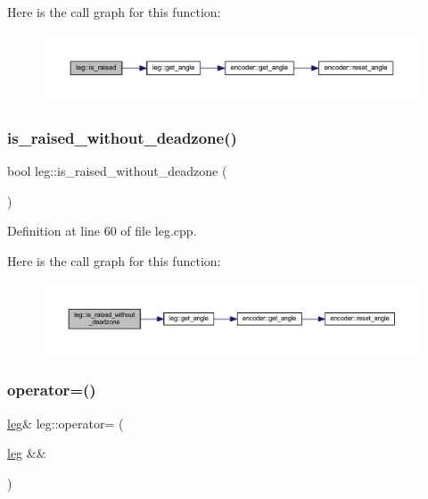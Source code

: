 Here is the call graph for this function\+:
\nopagebreak
\begin{figure}[H]
\begin{center}
\leavevmode
\includegraphics[width=350pt]{classleg_a24893e209229c5a70d748f2471cd4370_cgraph}
\end{center}
\end{figure}
\mbox{\label{classleg_a1dbdd2bb120d877c15b1ea831b720135}} 
\subsubsection{\texorpdfstring{is\_raised\_without\_deadzone()}{is\_raised\_without\_deadzone()}}
{\footnotesize\ttfamily bool leg\+::is\+\_\+raised\+\_\+without\+\_\+deadzone (\begin{DoxyParamCaption}{ }\end{DoxyParamCaption})}



Definition at line 60 of file leg.\+cpp.

Here is the call graph for this function\+:
\nopagebreak
\begin{figure}[H]
\begin{center}
\leavevmode
\includegraphics[width=350pt]{classleg_a1dbdd2bb120d877c15b1ea831b720135_cgraph}
\end{center}
\end{figure}
\mbox{\label{classleg_a4fe626ec8260c58442d0bf4f6e092e57}} 
\subsubsection{\texorpdfstring{operator=()}{operator=()}\hspace{0.1cm}{\footnotesize\ttfamily [1/2]}}
{\footnotesize\ttfamily \mbox{\hyperlink{classleg}{leg}}\& leg\+::operator= (\begin{DoxyParamCaption}\item[{\mbox{\hyperlink{classleg}{leg}} \&\&}]{ }\end{DoxyParamCaption})\hspace{0.3cm}{\ttfamily [default]}}


